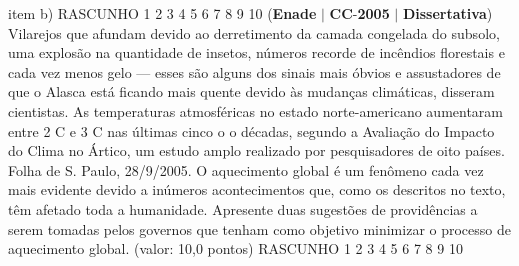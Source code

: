 \documentclass{exam}
\begin{document}
\begin{questions}
item b) RASCUNHO
1
2
3
4
5
6
7
8
9
10
\question (\textbf{Enade} $|$ \textbf{CC}-\textbf{2005} $|$ \textbf{Dissertativa})
Vilarejos que afundam devido ao derretimento da camada congelada do subsolo, uma explosão na
quantidade de insetos, números recorde de incêndios florestais e cada vez menos gelo — esses são alguns dos
sinais mais óbvios e assustadores de que o Alasca está ficando mais quente devido às mudanças climáticas,
disseram cientistas.
As temperaturas atmosféricas no estado norte-americano aumentaram entre 2 C e 3 C nas últimas cinco
o o
décadas, segundo a Avaliação do Impacto do Clima no Ártico, um estudo amplo realizado por pesquisadores
de oito países.
Folha de S. Paulo, 28/9/2005.
O aquecimento global é um fenômeno cada vez mais evidente devido a inúmeros acontecimentos que, como os descritos no texto, têm
afetado toda a humanidade. Apresente duas sugestões de providências a serem tomadas pelos governos que tenham como objetivo
minimizar o processo de aquecimento global. (valor: 10,0 pontos)
RASCUNHO
1
2
3
4
5
6
7
8
9
10


\end{questions}
\end{document}
